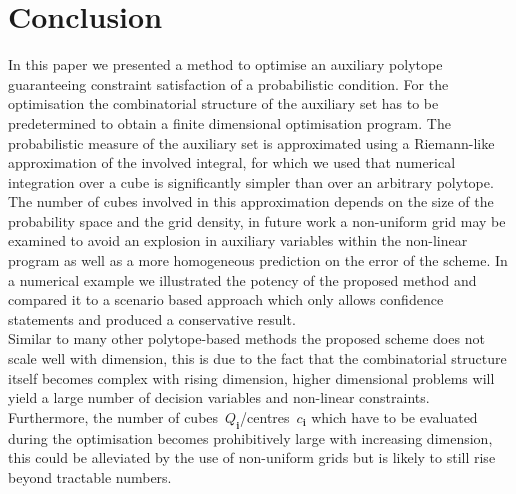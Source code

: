 \documentclass[letterpaper, 10pt, conference]{ieeeconf} %
\providecommand{\bfa}[1]{\mathbf{#1}}
\begin{document}
\section{Conclusion}\label{sec:conclusion}
%
%
%
%
%
In this paper we presented a method to optimise an auxiliary polytope guaranteeing constraint satisfaction of a probabilistic condition.
%
For the optimisation the combinatorial structure of the auxiliary set has to be predetermined to obtain a finite dimensional optimisation program.
%
The probabilistic measure of the auxiliary set is approximated using a Riemann-like approximation of the involved integral, for which we used that numerical integration over a cube is significantly simpler than over an arbitrary polytope.
%
The number of cubes involved in this approximation depends on the size of the probability space and the grid density, in future work a non-uniform grid may be examined to avoid an explosion in auxiliary variables within the non-linear program as well as a more homogeneous prediction on the error of the scheme.
%
In a numerical example we illustrated the potency of the proposed method and compared it to a scenario based approach which only allows confidence statements and produced a conservative result.
%
\\[1em]
%
Similar to many other polytope-based methods the proposed scheme does not scale well with dimension, this is due to the fact that the combinatorial structure itself becomes complex with rising dimension, higher dimensional problems will yield a large number of decision variables and non-linear constraints.
%
Furthermore, the number of cubes~$Q_\bfa{i}$/centres~$c_\bfa{i}$ which have to be evaluated during the optimisation becomes prohibitively large with increasing dimension, this could be alleviated by the use of non-uniform grids but is likely to still rise beyond tractable numbers.

\printbibliography
\end{document}
